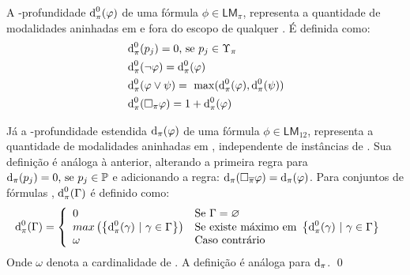            \begin{definicao}
                \label{def:piProfundidade}
                A \PI-profundidade \(\operatorname{d}^{0}_{\pi}(\varphi)\) de uma fórmula \(\phi \in \mathsf{LM}_\pi\), representa a quantidade de modalidades \BOXi{\pi}
                aninhadas em \PHI e fora do escopo de qualquer \BOXi{{\overline{\pi}}}. É definida como:
                \begin{align*}
                    & \funcao{d}^{0}_{\pi}(p_j) = 0 \text{, se } p_j \in \Upsilon_\pi \\
                    & \funcao{d}^{0}_{\pi}(\neg \phi) = \funcao{d}^{0}_{\pi}(\phi) \\
                    & \funcao{d}^{0}_{\pi}(\phi \lor \psi) = \ \funcao{max}(\funcao{d}^{0}_{\pi}(\phi), \funcao{d}^{0}_{\pi}(\psi)) \\
                    & \funcao{d}^{0}_{\pi}(\Box_\pi \phi) = 1 + \funcao{d}^{0}_{\pi}(\phi)
                \end{align*}

                Já a \PI-profundidade estendida \(\operatorname{d}_{\pi}(\varphi)\) de uma fórmula \(\phi \in \mathsf{LM}_{12}\), representa a quantidade de modalidades
                \BOXi{\pi} aninhadas em \PHI, independente de instâncias de \BOXi{\overline{\pi}}. Sua definição é análoga à anterior, alterando a primeira regra para
                \(\operatorname{d}_{\pi}(p_j) = 0 \text{, se } p_j \in \mathbb{P}\) e adicionando a regra: \(\operatorname{d}_{\pi}(\Box_{\overline{\pi}} \varphi) = \operatorname{d}_{\pi}(\varphi)\).
                Para conjuntos de fórmulas \GAMMA, \(\operatorname{d}^{0}_{\pi}(\Gamma)\) é definido como:
                \begin{align*}
                    & \operatorname{d}^{0}_{\pi}(\Gamma) = \left\{ \begin{array}{ll}
                        0 & \text{Se } \Gamma = \varnothing \\
                        max\left(\left\{\operatorname{d}^{0}_{\pi}(\gamma) \ | \ \gamma \in \Gamma \right\}\right) & \text{Se existe máximo em } \left\{\operatorname{d}^{0}_{\pi}(\gamma) \ | \ \gamma \in \Gamma \right\} \\
                        \omega & \text{Caso contrário}
                    \end{array} \right.
                \end{align*}
                Onde \(\omega\) denota a cardinalidade de . A definição é análoga para \(\operatorname{d}_{\pi}\). \qed
            \end{definicao}

